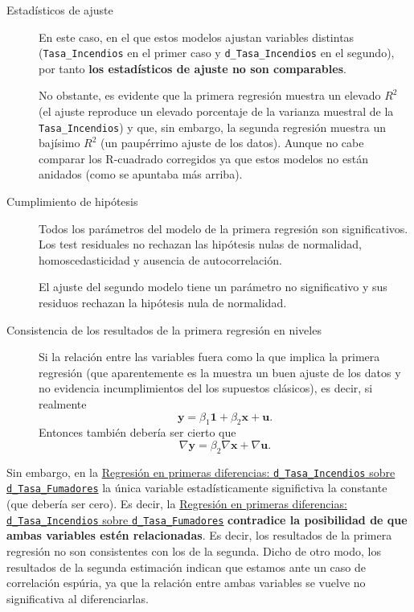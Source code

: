 \documentclass[10pt]{article}
\begin{document}
\begin{description}
\item[{Estadísticos de ajuste}] En este caso, en el que estos modelos ajustan variables distintas (\texttt{Tasa\_Incendios} en el primer caso y \texttt{d\_Tasa\_Incendios} en el segundo), por tanto \textbf{los estadísticos de ajuste no son comparables}.

No obstante, es evidente que la primera regresión muestra un elevado \(R^2\) (el ajuste reproduce un elevado porcentaje de la varianza muestral de la \texttt{Tasa\_Incendios}) y que, sin embargo, la segunda regresión muestra un bajísimo \(R^2\) (un paupérrimo ajuste de los datos). Aunque no cabe comparar los R-cuadrado corregidos ya que estos modelos no están anidados (como se apuntaba más arriba).

\item[{Cumplimiento de hipótesis}] Todos los parámetros del modelo de la primera regresión son significativos. Los test residuales no rechazan las hipótesis nulas de normalidad, homoscedasticidad y ausencia de autocorrelación.

El ajuste del segundo modelo tiene un parámetro no significativo y sus residuos rechazan la hipótesis nula de normalidad.

\item[{Consistencia de los resultados de la primera regresión en niveles}] Si la relación entre las variables fuera como la que implica la primera regresión (que aparentemente es la muestra un buen ajuste de los datos y no evidencia incumplimientos del los supuestos clásicos), es decir, si realmente  $$\boldsymbol{y}=\beta_1\boldsymbol{1}+\beta_2\boldsymbol{x}+\boldsymbol{u}.$$ Entonces también debería ser cierto que $$\nabla\boldsymbol{y}=\beta_2\nabla\boldsymbol{x}+\nabla\boldsymbol{u}.$$
\end{description}

Sin embargo, en la \hyperref[sec:org229f929]{Regresión en primeras diferencias: \texttt{d\_Tasa\_Incendios} sobre \texttt{d\_Tasa\_Fumadores}} la única variable estadísticamente significtiva la constante (que debería ser cero). 
Es decir, la \hyperref[sec:org229f929]{Regresión en primeras diferencias: \texttt{d\_Tasa\_Incendios} sobre \texttt{d\_Tasa\_Fumadores}} \textbf{contradice la posibilidad de que ambas variables estén relacionadas}. Es decir, los resultados de la primera regresión no son consistentes con los de la segunda. Dicho de otro modo, los resultados de la segunda estimación indican que estamos ante un caso de correlación espúria, ya que la relación entre ambas variables se vuelve no significativa al diferenciarlas.
\end{document}
